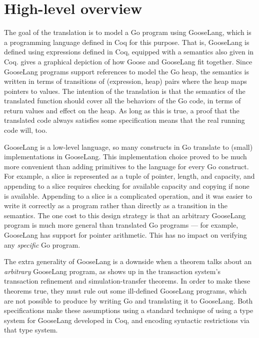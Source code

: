 \section{High-level overview}

The goal of the translation is to model a Go program using GooseLang,
which is a programming language defined in Coq for this purpose. That is,
GooseLang is defined using expressions defined in Coq, equipped with a
semantics also given in Coq.  gives a graphical
depiction of how Goose and GooseLang fit together. Since GooseLang programs support references
to model the Go heap, the semantics is written in terms of transitions
of (expression, heap) pairs where the heap maps pointers to values. The
intention of the translation is that the semantics of the translated
function should cover all the behaviors of the Go code, in terms of
return values and effect on the heap. As long as this is true, a proof
that the translated code always satisfies some specification means that
the real running code will, too.

GooseLang is a low-level language, so many constructs in Go translate to
(small) implementations in GooseLang. This implementation choice proved
to be much more convenient than adding primitives to the language for
every Go construct. For example, a slice is represented as a tuple of
pointer, length, and capacity, and appending to a slice requires
checking for available capacity and copying if none is available.
Appending to a slice is a complicated operation, and it was easier to
write it correctly as a program rather than directly as a transition in
the semantics. The one cost to this design strategy is that an arbitrary
GooseLang program is much more general than translated Go programs --- for
example, GooseLang has support for pointer arithmetic. This
has no impact on verifying any \emph{specific} Go program.

The extra generality of GooseLang is a downside when a theorem talks about an
\emph{arbitrary} GooseLang program, as shows up in the transaction system's
transaction refinement and simulation-transfer theorems. In order to make these
theorems true, they must rule out
some ill-defined GooseLang programs, which are
not possible to produce by writing Go and translating it to GooseLang. Both
specifications make these assumptions using a
standard technique of using a type system for GooseLang developed in Coq, and encoding
syntactic restrictions via that type system.

